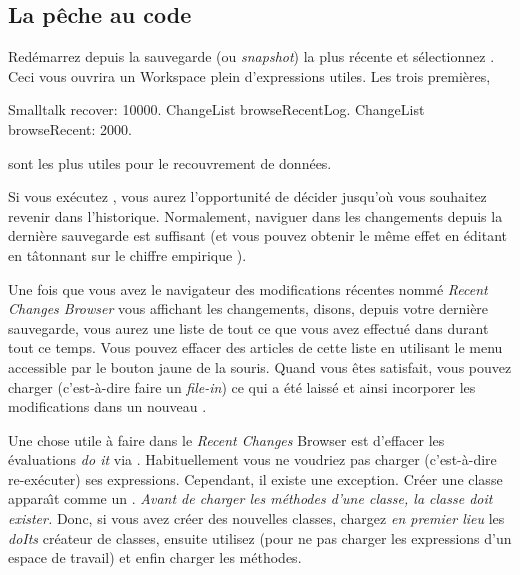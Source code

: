 \documentclass[a4paper,10pt,twoside]{book}
\begin{document}
\subsection{La p\^eche au code}

Red\'emarrez \sq depuis la sauvegarde (ou \emph{snapshot}) la plus r\'ecente et
s\'electionnez . 
Ceci vous ouvrira un Workspace plein d'expressions utiles. Les trois premi\`eres,

\begin{code}{}
Smalltalk recover: 10000.
ChangeList browseRecentLog.
ChangeList browseRecent: 2000.
\end{code}

\noindent
sont les plus utiles pour le recouvrement de donn\'ees.

Si vous ex\'ecutez , vous aurez l'opportunit\'e
de d\'ecider jusqu'o\`u vous souhaitez revenir dans l'historique.
Normalement, naviguer dans les changements depuis la derni\`ere sauvegarde
est suffisant (et vous pouvez obtenir le m\^eme effet en \'editant 
 en t\^atonnant sur le chiffre empirique
).

Une fois que vous avez le navigateur des modifications r\'ecentes nomm\'e
\emph{Recent Changes Browser} vous affichant les changements, disons, depuis votre
derni\`ere sauvegarde, vous aurez une liste de tout ce que vous avez effectu\'e 
dans \sq durant tout ce temps.
Vous pouvez effacer des articles de cette liste en utilisant le menu accessible
par le {bouton jaune} de la souris. Quand vous \^etes satisfait, vous
pouvez charger (c'est-à-dire faire un \emph{file-in}) ce qui a \'et\'e laiss\'e
et ainsi incorporer les modifications dans un nouveau \changeset.

Une chose utile \`a faire dans le \emph{Recent Changes} Browser est
d'effacer les \'evaluations \emph{do it} via . 
Habituellement vous ne voudriez pas charger (c'est-à-dire re-ex\'ecuter) ses expressions.
Cependant, il existe une exception.
Cr\'eer une classe appara\^{\i}t comme un .
\emph{Avant de charger les m\'ethodes d'une classe, la classe doit exister.}
Donc, si vous avez cr\'eer des nouvelles classes, chargez \emph{en premier lieu} 
les \emph{doIts} cr\'eateur de classes, ensuite utilisez  
(pour ne pas charger les expressions d'un espace de travail)
et enfin charger les m\'ethodes.
\end{document}
